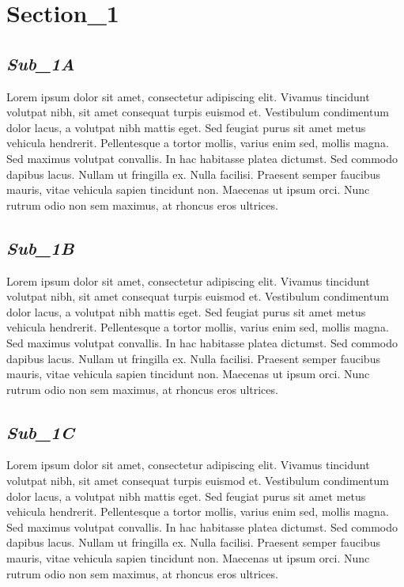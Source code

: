 \documentclass[a4paper]{article}
\begin{document}
\section*{Section\_1}
	\begin{minipage}{0.9\textwidth}
		
		\subsection*{\textit{Sub\_1A}}
		Lorem ipsum dolor sit amet, consectetur adipiscing elit. Vivamus tincidunt volutpat nibh, sit amet consequat turpis euismod et. Vestibulum condimentum dolor lacus, a volutpat nibh mattis eget. Sed feugiat purus sit amet metus vehicula hendrerit. Pellentesque a tortor mollis, varius enim sed, mollis magna. Sed maximus volutpat convallis. In hac habitasse platea dictumst. Sed commodo dapibus lacus. Nullam ut fringilla ex. Nulla facilisi. Praesent semper faucibus mauris, vitae vehicula sapien tincidunt non. Maecenas ut ipsum orci. Nunc rutrum odio non sem maximus, at rhoncus eros ultrices.
		
		\subsection*{\textit{Sub\_1B}}
		Lorem ipsum dolor sit amet, consectetur adipiscing elit. Vivamus tincidunt volutpat nibh, sit amet consequat turpis euismod et. Vestibulum condimentum dolor lacus, a volutpat nibh mattis eget. Sed feugiat purus sit amet metus vehicula hendrerit. Pellentesque a tortor mollis, varius enim sed, mollis magna. Sed maximus volutpat convallis. In hac habitasse platea dictumst. Sed commodo dapibus lacus. Nullam ut fringilla ex. Nulla facilisi. Praesent semper faucibus mauris, vitae vehicula sapien tincidunt non. Maecenas ut ipsum orci. Nunc rutrum odio non sem maximus, at rhoncus eros ultrices.
		
		\subsection*{\textit{Sub\_1C}}
		Lorem ipsum dolor sit amet, consectetur adipiscing elit. Vivamus tincidunt volutpat nibh, sit amet consequat turpis euismod et. Vestibulum condimentum dolor lacus, a volutpat nibh mattis eget. Sed feugiat purus sit amet metus vehicula hendrerit. Pellentesque a tortor mollis, varius enim sed, mollis magna. Sed maximus volutpat convallis. In hac habitasse platea dictumst. Sed commodo dapibus lacus. Nullam ut fringilla ex. Nulla facilisi. Praesent semper faucibus mauris, vitae vehicula sapien tincidunt non. Maecenas ut ipsum orci. Nunc rutrum odio non sem maximus, at rhoncus eros ultrices.
		
	\end{minipage}
\end{document}
